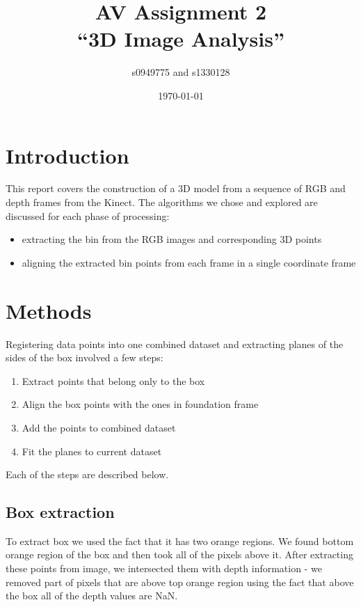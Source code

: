 \documentclass{article}
\begin{document}
\title{AV Assignment 2\\``3D Image Analysis''}
\author{s0949775 and s1330128}
\date{\today}
\maketitle


\section{Introduction}
This report covers the construction of a 3D model from a 
sequence of RGB and depth frames from the Kinect. 
The algorithms we chose and explored are discussed for
each phase of processing: 
\begin{itemize}
\item extracting the bin from the RGB images and corresponding 3D points
\item  aligning the extracted bin points from each frame in a single coordinate frame
\end{itemize}

\section{Methods}
Registering data points into one combined dataset and 
extracting planes of the sides of the box involved a few 
steps:

\begin{enumerate}
  \item Extract points that belong only to the box
  \item Align the box points with the ones in foundation frame
  \item Add the points to combined dataset
  \item Fit the planes to current dataset
\end{enumerate}

Each of the steps are described below.

\subsection{Box extraction}
To extract box we used the fact that it has two orange regions.
We found bottom orange region of the box and then took all of the
pixels above it. After extracting these points from image, we 
intersected them with depth information - we removed part of
pixels that are above top orange region using the fact that above
the box all of the depth values are NaN.
\end{document}
